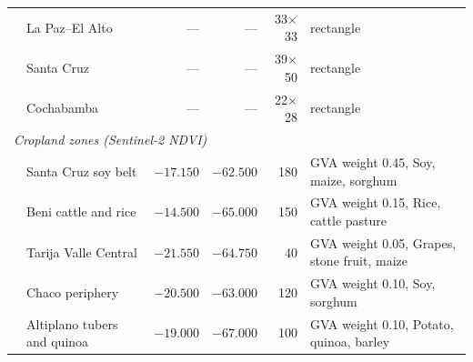\begin{table}[H]
\begin{tabular}{llrrrl}
& La Paz--El Alto & --- & --- & 33$\times$33 & rectangle \\
& Santa Cruz & --- & --- & 39$\times$50 & rectangle \\
& Cochabamba & --- & --- & 22$\times$28 & rectangle \\
\midrule
\multicolumn{6}{l}{\textit{Cropland zones (Sentinel-2 NDVI)}} \\
& Santa Cruz soy belt & $-17.150$ & $-62.500$ & 180 & GVA weight 0.45, Soy, maize, sorghum \\
& Beni cattle and rice & $-14.500$ & $-65.000$ & 150 & GVA weight 0.15, Rice, cattle pasture \\
& Tarija Valle Central & $-21.550$ & $-64.750$ & 40 & GVA weight 0.05, Grapes, stone fruit, maize \\
& Chaco periphery & $-20.500$ & $-63.000$ & 120 & GVA weight 0.10, Soy, sorghum \\
& Altiplano tubers and quinoa & $-19.000$ & $-67.000$ & 100 & GVA weight 0.10, Potato, quinoa, barley \\
\bottomrule
\end{tabular}
\end{table}